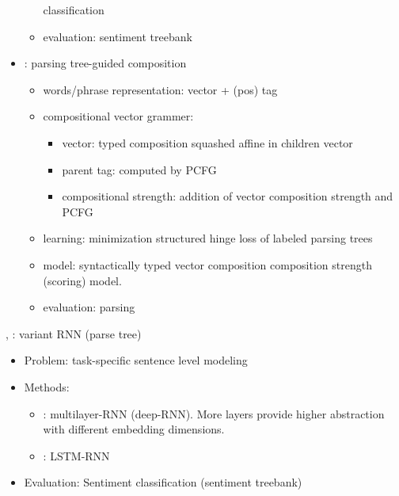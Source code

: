 \documentclass{article} %
\begin{document}
\begin{itemize}
\begin{itemize}
		classification
	\item evaluation: sentiment treebank
	\end{itemize}
\item \cite{socher2013parsing}: parsing tree-guided composition
	\begin{itemize}
	\item words/phrase representation: vector + (pos) tag
	\item compositional vector grammer:
		 \begin{itemize}
		 \item vector: typed composition squashed affine in
		 	children vector
		 \item parent tag: computed by PCFG
		 \item compositional strength: addition of vector
		 	composition strength and PCFG
		 \end{itemize}
	\item learning: minimization structured hinge loss of
		labeled parsing trees
	\item model: syntactically typed vector composition
		composition strength (scoring) model.
	\item evaluation: parsing
	\end{itemize}
\end{itemize}


\cite{irsoy2014deep}, \cite{le2015compositional}:
	variant RNN (parse tree)
\begin{itemize}
\item Problem: task-specific sentence level modeling
\item Methods:
	\begin{itemize}
	\item \cite{irsoy2014deep}: multilayer-RNN (deep-RNN). More layers provide
		higher abstraction with different embedding dimensions.
	\item \cite{le2015compositional}: LSTM-RNN
	\end{itemize}
\item Evaluation: Sentiment classification (sentiment treebank)
\end{itemize}
\end{document}
